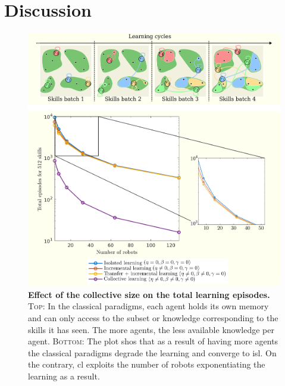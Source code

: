 \documentclass[12pt]{article}
\begin{document}
\section*{Discussion}\label{sec:discussion}

\begin{figure}[t!]
	\centering
	\hspace*{\fill}
	\includegraphics[width=16cm]{learning_paradigms_and_size_of_collective.png}
	\hspace*{\fill}
	\caption[] {\label{fig:learning_paradigms_and_size_of_collective} \textbf{Effect of the collective size on the total learning episodes.} {\textsc{Top}: In the classical paradigms, each agent holds its own memory and can only access to the subset or knowledge corresponding to the skills it has seen. The more agents, the less available knowledge per agent. \textsc{Bottom}: The plot shos that as a result of having more agents the classical paradigms degrade the learning and converge to \acl{isl}. On the contrary, \acl{cl} exploits the number of robots exponentiating the learning as a result.}}
\end{figure}
\end{document}
